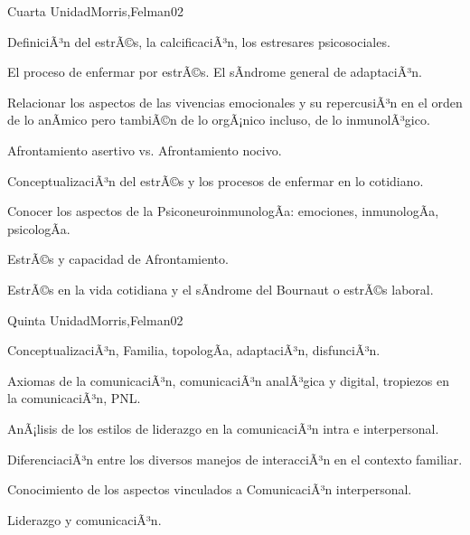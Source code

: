 \begin{syllabus}
\begin{unit}{Cuarta Unidad}{Morris,Felman}{0}{2}
\begin{topics}
	\item DefiniciÃ³n del estrÃ©s, la calcificaciÃ³n, los estresares psicosociales.
	\item El proceso de enfermar por estrÃ©s. El sÃ­ndrome general de adaptaciÃ³n.
	\item Relacionar los aspectos de las vivencias emocionales y su repercusiÃ³n en el orden de lo anÃ­mico pero tambiÃ©n de lo orgÃ¡nico incluso, de lo inmunolÃ³gico.
	\item Afrontamiento asertivo vs. Afrontamiento nocivo.
\end{topics}
\begin{unitgoals}
	\item ConceptualizaciÃ³n del estrÃ©s y los procesos de enfermar en lo cotidiano.
	\item Conocer los aspectos de la PsiconeuroinmunologÃ­a: emociones, inmunologÃ­a, psicologÃ­a.
	\item EstrÃ©s y capacidad de Afrontamiento.
	\item EstrÃ©s en la vida cotidiana y el sÃ­ndrome del Bournaut o estrÃ©s laboral.
\end{unitgoals}
\end{unit}

\begin{unit}{Quinta Unidad}{Morris,Felman}{0}{2}
\begin{topics}
	\item ConceptualizaciÃ³n, Familia, topologÃ­a, adaptaciÃ³n, disfunciÃ³n.
	\item Axiomas de la comunicaciÃ³n, comunicaciÃ³n analÃ³gica y digital, tropiezos en la comunicaciÃ³n, PNL.
	\item AnÃ¡lisis de los estilos de liderazgo en la comunicaciÃ³n intra e interpersonal.
\end{topics}
\begin{unitgoals}
	\item DiferenciaciÃ³n entre los diversos manejos de interacciÃ³n en el contexto familiar.
	\item Conocimiento de los aspectos vinculados a ComunicaciÃ³n interpersonal.
	\item Liderazgo y comunicaciÃ³n.
\end{unitgoals}
\end{unit}


\end{syllabus}
